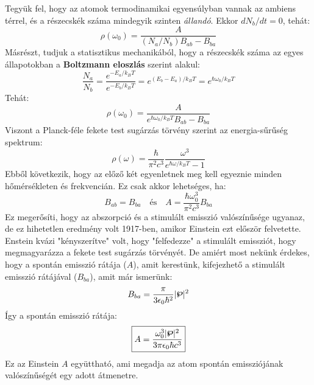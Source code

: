 \documentclass[../main.tex]{subfiles}
\begin{document}
Tegyük fel, hogy az atomok termodinamikai egyensúlyban vannak az ambiens térrel, és a részecskék száma mindegyik szinten \textit{állandó}. Ekkor $dN_b/dt = 0$, tehát:
\begin{equation}
    \rho(\omega_0) = \frac{A}{(N_a / N_b) B_{ab} - B_{ba}}
\end{equation}
Másrészt, tudjuk a statisztikus mechanikából, hogy a részecskék száma az egyes állapotokban a \textbf{Boltzmann eloszlás} szerint alakul:
\begin{equation}
    \frac{N_a}{N_b} = \frac{e^{-E_a / k_B T}}{e^{-E_b / k_B T}} = e^{(E_b - E_a) / k_B T} = e^{\hbar \omega_0 / k_B T}
\end{equation}
Tehát:
\begin{equation}
    \rho(\omega_0) = \frac{A}{e^{\hbar \omega_0 / k_B T} B_{ab} - B_{ba}}
\end{equation}
Viszont a Planck-féle fekete test sugárzás törvény szerint az energia-sűrűség spektrum:
\begin{equation}
    \rho(\omega) = \frac{\hbar}{\pi^2 c^3} \frac{\omega^3}{e^{\hbar \omega / k_B T} - 1}
\end{equation}
Ebből következik, hogy az előző két egyenletnek meg kell egyeznie minden hőmérsékleten és frekvencián. Ez csak akkor lehetséges, ha:
\begin{equation}
    B_{ab} = B_{ba} \quad \text{és} \quad A = \frac{\hbar \omega_0^3}{\pi^2 c^3} B_{ba}
\end{equation}
Ez megerősíti, hogy az abszorpció és a stimulált emisszió valószínűsége ugyanaz, de ez hihetetlen eredmény volt 1917-ben, amikor Einstein ezt először felvetette.
Enstein kvázi "kényszerítve" volt, hogy "felfedezze" a stimulált emissziót, hogy megmagyarázza a fekete test sugárzás törvényét.
De amiért most nekünk érdekes, hogy a spontán emisszió rátája ($A$), amit kerestünk, kifejezhető a stimulált emisszió rátájával ($B_{ba}$), amit már ismerünk:
\begin{equation}
    B_{ba} = \frac{\pi}{3 \epsilon_0 \hbar^2} |\boldsymbol{\pw}|^2
\end{equation}
Így a spontán emisszió rátája:
\begin{equation}
    \boxed{A = \frac{\omega_0^3 |\boldsymbol{\pw}|^2}{3 \pi \epsilon_0 \hbar c^3}}
\end{equation}
Ez az Einstein $A$ együttható, ami megadja az atom spontán emissziójának valószínűségét egy adott átmenetre.
\end{document}
